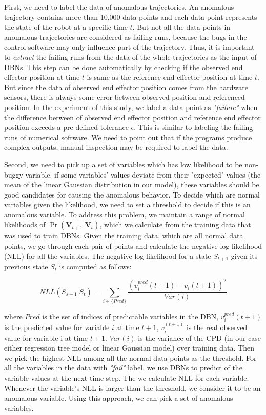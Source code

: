 First, we need to label the data of anomalous trajectories. An anomalous trajectory contains more than 10,000 data points and each data point represents the state of the robot at a specific time $t$. But not all the data points in anomalous trajectories are considered as failing runs, because the bugs in the control software may only influence part of the trajectory. Thus, it is important to {\it extract} the failing runs from the data of the whole trajectories as the input of DBNs. This step can be done automatically by checking if the observed end effector position at time $t$ is same as the reference end effector position at time $t$. But since the data of observed end effector position comes from the hardware sensors, there is always some error between observed position and referenced position. In the experiment of this study, we label a data point as {\it "failure"} when the difference between of observed end effector position and reference end effector position exceeds a pre-defined tolerance $\epsilon$. This is similar to labeling the failing runs of numerical software. We need to point out that if the programs produce complex outputs, manual inspection may be required to label the data.

Second, we need to pick up a set of variables which has low likelihood to be non-buggy variable. if some variables' values deviate from their "expected" values (the mean of the linear Gaussian distribution in our model), these variables should be good candidates for causing the anomalous behavior.  To decide which are normal variables given the likelihood, we need to set a threshold to decide if this is an anomalous variable. To address this problem, we maintain a range of normal likelihoods of $\Pr ({\pmb{V}_{t + 1}}|{\pmb{V}_t})$, which we calculate from the training data that was used to train DBNs.  Given the training data, which are all normal data points, we go through each pair of points and calculate the negative log likelihood (NLL) for all the variables. The negative log likelihood for a state $S_{t+1}$ given its previous state ${S_t}$ is computed as follows:

\begin{equation}
NLL({S_{s + 1}}|{S_t}) = \sum\limits_{i \in \{ Pred\} } {\frac{{{{(v_i^{pred}(t + 1) - {v_i}(t + 1))}^2}}}{{Var(i)}}} 
\end{equation}

where $Pred$ is the set of indices of predictable variables in the DBN, $v_{i}^{pred}(t+1)$ is the predicted value for variable $i$ at time $t + 1$, $v_{i}^{(t + 1)}$ is the real observed value for variable i at time $t+ 1$. $Var(i)$ is the variance of the CPD (in our case either regression tree model or linear Gaussian model) over training data. Then we pick the highest NLL among all the normal data points as the threshold.  For all the variables in the data with {\it "fail"} label, we use DBNs to predict of the variable values at the next time step. The we calculate NLL for each variable. Whenever the variable’s NLL is larger than the threshold, we consider it to be an anomalous variable. Using this approach, we can pick a set of anomalous variables.

